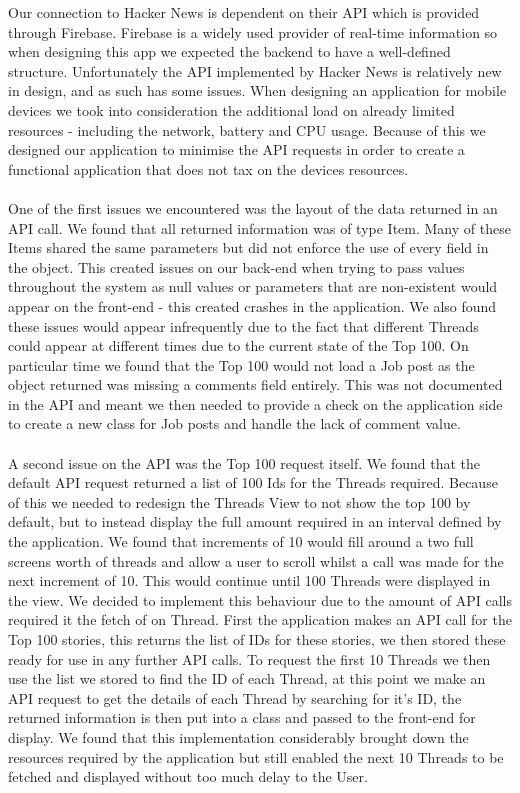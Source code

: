 \documentclass[11pt]{article}
\begin{document}
Our connection to Hacker News is dependent on their API which is provided through Firebase. Firebase is a widely used provider of real-time information so when designing this app we expected the backend to have a well-defined structure. Unfortunately the API implemented by Hacker News is relatively new in design, and as such has some issues. When designing an application for mobile devices we took into consideration the additional load on already limited resources - including the network, battery and CPU usage. Because of this we designed our application to minimise the API requests in order to create a functional application that does not tax on the devices resources.
\\
\\
One of the first issues we encountered was the layout of the data returned in an API call. We found that all returned information was of type Item. Many of these Items shared the same parameters but did not enforce the use of every field in the object. This created issues on our back-end when trying to pass values throughout the system as null values or parameters that are non-existent would appear on the front-end - this created crashes in the application. We also found these issues would appear infrequently due to the fact that different Threads could appear at different times due to the current state of the Top 100. On particular time we found that the Top 100 would not load a Job post as the object returned was missing a comments field entirely. This was not documented in the API and meant we then needed to provide a check on the application side to create a new class for Job posts and handle the lack of comment value.
\\
\\
A second issue on the API was the Top 100 request itself. We found that the default API request returned a list of 100 Ids for the Threads required. Because of this we needed to redesign the Threads View to not show the top 100 by default, but to instead display the full amount required in an interval defined by the application. We found that increments of 10 would fill around a two full screens worth of threads and allow a user to scroll whilst a call was made for the next increment of 10. This would continue until 100 Threads were displayed in the view. We decided to implement this behaviour due to the amount of API calls required it the fetch of on Thread. First the application makes an API call for the Top 100 stories, this returns the list of IDs for these stories, we then stored these ready for use in any further API calls. To request the first 10 Threads we then use the list we stored to find the ID of each Thread, at this point we make an API request to get the details of each Thread by searching for it's ID, the returned information is then put into a class and passed to the front-end for display. We found that this implementation considerably brought down the resources required by the application but still enabled the next 10 Threads to be fetched and displayed without too much delay to the User.
\end{document}
